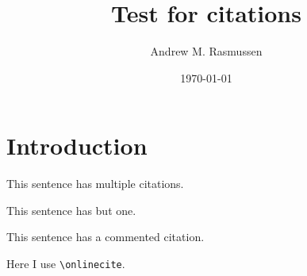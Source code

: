 \documentclass[aip,jcp,amsmath,amssymb,reprint,floatfix]{revtex4-1}
\begin{document}
\title{Test for citations}
\author{Andrew M. Rasmussen}
\date{\today}

\maketitle

\section{Introduction}\label{introduction}

This sentence has multiple citations.\cite{Skolnick2004,Wood2010}

This sentence has but one.\cite{Kos2005}

This sentence has a commented citation.%

Here I use  \verb|\onlinecite|.


\end{document}
